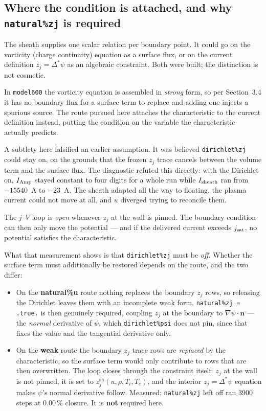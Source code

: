 \documentclass[11pt,a4paper]{article}
\newcommand{\zj}{z_j}
\newcommand{\zjsh}{z^{\mathrm{sh}}_{j}}
\newcommand{\code}[1]{\texttt{\small #1}}
\begin{document}
\subsection{Where the condition is attached, and why \code{natural\%zj} is required}

The sheath supplies one scalar relation per boundary point. It could go on the vorticity (charge
continuity) equation as a surface flux, or on the current definition $\zj=\Delta^{*}\psi$ as an
algebraic constraint. Both were built; the distinction is not cosmetic.

In \code{model600} the vorticity equation is assembled in \emph{strong} form, so per Section~3.4 it
has no boundary flux for a surface term to replace and adding one injects a spurious source. The
route pursued here attaches the characteristic to the current definition instead, putting the
condition on the variable the characteristic actually predicts.

A subtlety here falsified an earlier assumption. It was believed \code{dirichlet\%zj} could stay on,
on the grounds that the frozen $\zj$ trace cancels between the volume term and the surface flux. The
diagnostic refuted this directly: with the Dirichlet on, $I_{\rm Amp}$ stayed constant to four digits
for a whole run while $I_{\rm sheath}$ ran from $-15540$~A to $-23$~A. The sheath adapted all the way
to floating, the plasma current could not move at all, and $u$ diverged trying to reconcile them.

\begin{plain}
The $j$--$V$ loop is \emph{open} whenever $\zj$ at the wall is pinned. The boundary condition can then
only move the potential --- and if the delivered current exceeds $j_{\rm sat}$, no potential satisfies
the characteristic.
\end{plain}

What that measurement shows is that \code{dirichlet\%zj} must be \emph{off}. Whether the surface
term must additionally be restored depends on the route, and the two differ:

\begin{itemize}\itemsep3pt
\item On the \textbf{natural\%u} route nothing replaces the boundary $\zj$ rows, so releasing the
  Dirichlet leaves them with an incomplete weak form. \code{natural\%zj = .true.} is then genuinely
  required, coupling $\zj$ at the boundary to $\nabla\psi\!\cdot\!\bm{n}$ --- the \emph{normal}
  derivative of $\psi$, which \code{dirichlet\%psi} does not pin, since that fixes the value and
  the tangential derivative only.
\item On the \textbf{weak} route the boundary $\zj$ trace rows are \emph{replaced} by the
  characteristic, so the surface term would only contribute to rows that are then overwritten. The
  loop closes through the constraint itself: $\zj$ at the wall is not pinned, it is set to
  $\zjsh(u,\rho,T_i,T_e)$, and the interior $\zj = \Delta^{*}\psi$ equation makes $\psi$'s normal
  derivative follow. Measured: \code{natural\%zj} left off ran 3900 steps at $0.00\,\%$ closure.
  It is \textbf{not} required here.
\end{itemize}
\end{document}
